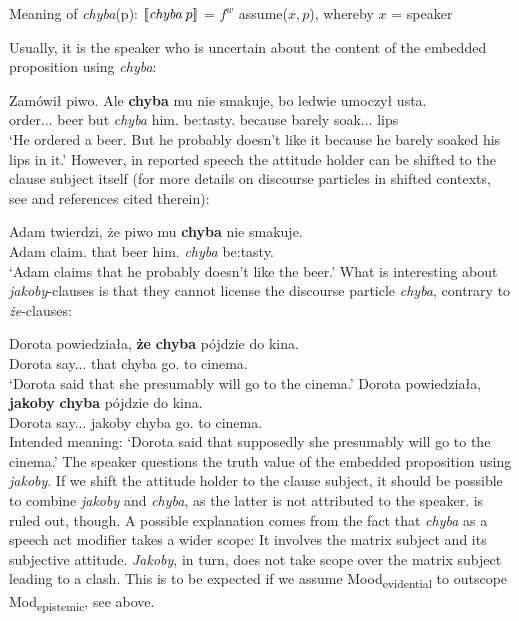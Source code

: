 \documentclass[output=paper
,modfonts
,nonflat]{langsci/langscibook}
\begin{document}
\ea	Meaning of \emph{chyba}(p): \newline
	\([\![\emph{chyba} \; p]\!]\) = $f^{w}$ assume(\( x,p \)), whereby \(x\) = speaker
\z
       
\noindent Usually, it is the speaker who is uncertain about the content of the embedded proposition using \emph{chyba}: 

\ea \gll Zamówił piwo. Ale \textbf{chyba} mu nie smakuje, bo ledwie umoczył usta. \\
		order.{\lptcp}.{\sg}.{\masc} beer but \emph{chyba} him.{\dat} {\negation} {be:tasty}.{\thirdperson}{\sg} because barely soak.{\lptcp}.{\sg}.{\masc} lips \\  
\glt	`He ordered a beer. But he probably doesn't like it because he barely soaked his lips in it.' 
\z
However, in reported speech the attitude holder can be shifted to the clause subject itself (for more details on discourse particles in shifted contexts, see \textcite{Doring2013} and references cited therein):

\ea \gll Adam twierdzi, że piwo mu \textbf{chyba} nie smakuje. \\
		Adam claim.{\thirdperson}{\sg} that beer him.{\dat} \emph{chyba} {\negation} {be:tasty}.{\thirdperson}{\sg} \\
\glt	`Adam claims that he probably doesn't like the beer.' 
\z
What is interesting about \emph{jakoby}-clauses is that they cannot license the discourse particle \emph{chyba}, contrary to \emph{że}-clauses: 

\ea \ea \gll	Dorota powiedziała, \textbf{że} \textbf{chyba} pójdzie do kina. \\
		Dorota say.{\lptcp}.{\sg}.{\fem} that chyba go.{\thirdperson}{\sg} to cinema.{\gen} \\
		\glt`Dorota said that she presumably will go to the cinema.' 
		\ex\gll	*Dorota powiedziała, \textbf{jakoby} \textbf{chyba} pójdzie do kina. \label{kanapka} \\
			Dorota say.{\lptcp}.{\sg}.{\fem} jakoby chyba go.{\thirdperson}{\sg} to cinema.{\gen} \\
		\glt Intended meaning: `Dorota said that supposedly she presumably will go to the cinema.'  
\z\z
The speaker questions the truth value of the embedded proposition using \emph{jakoby}. If we shift the attitude holder to the clause subject, it should be possible to combine \emph{jakoby} and \emph{chyba}, as the latter is not attributed to the speaker.  is ruled out, though. A possible explanation comes from the fact that \emph{chyba} as a speech act modifier takes a wider scope: It involves the matrix subject and its subjective attitude. \emph{Jakoby}, in turn, does not take scope over the matrix subject leading to a clash. This is to be expected if we assume Mood\textsubscript{evidential} to outscope Mod\textsubscript{epistemic}, see  above. 
\end{document}
